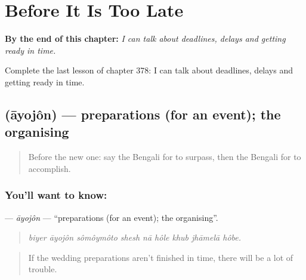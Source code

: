 
\chapter{Before It Is Too Late}
\label{ch:bn-before-it-is-too-late}

\begin{chapteropening}
\textbf{By the end of this chapter:} \emph{I can talk about deadlines, delays and getting ready in time.}

Complete the last lesson of chapter 378: I can talk about deadlines, delays and getting ready in time.
\end{chapteropening}

\section[\texorpdfstring{\bn{আয়োজন} (āyojôn)}{আয়োজন (āyojôn)}]{ (āyojôn) — preparations (for an event); the organising}

\label{lesson:BN-C378-ayojon}



\begin{quote}
Before the new one: say the Bengali for to surpass, then the Bengali for to accomplish.
\end{quote}

\subsection*{You'll want to know: }
\textbf{} — \emph{āyojôn} — \textquotedblleft{}preparations (for an event); the organising\textquotedblright{}.

\begin{quote}
        
\end{quote}

\begin{quote}
\emph{biyer āyojôn sômôymôto shesh nā hôle khub jhāmelā hôbe.}
\end{quote}

\begin{quote}
If the wedding preparations aren't finished in time, there will be a lot of trouble.
\end{quote}

